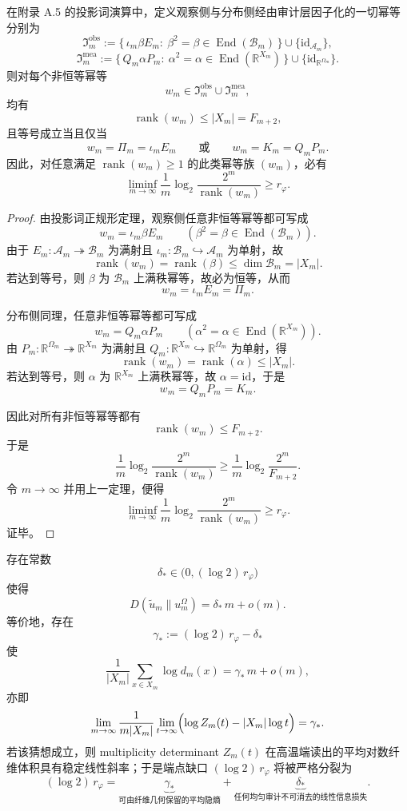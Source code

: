 \begin{theorem}[投影词演算在一次折叠后已饱和]\label{thm:conclusion-fold-audit-onefold-saturation}
在附录 A.5 的投影词演算中，定义观察侧与分布侧经由审计层因子化的一切幂等分别为
\[
\mathfrak I_m^{\mathrm{obs}}
:=
\{\,\iota_m\beta E_m:\ \beta^2=\beta\in \operatorname{End}(\mathcal B_m)\,\}
\cup
\{\mathrm{id}_{\mathcal A_m}\},
\]
\[
\mathfrak I_m^{\mathrm{mea}}
:=
\{\,Q_m\alpha P_m:\ \alpha^2=\alpha\in \operatorname{End}(\mathbb R^{X_m})\,\}
\cup
\{\mathrm{id}_{\mathbb R^{\Omega_m}}\}.
\]
则对每个非恒等幂等
\[
w_m\in \mathfrak I_m^{\mathrm{obs}}\cup \mathfrak I_m^{\mathrm{mea}},
\]
均有
\[
\operatorname{rank}(w_m)\le |X_m|=F_{m+2},
\]
且等号成立当且仅当
\[
w_m=\Pi_m=\iota_mE_m
\qquad\text{或}\qquad
w_m=K_m=Q_mP_m.
\]
因此，对任意满足 \(\operatorname{rank}(w_m)\ge 1\) 的此类幂等族 \((w_m)\)，必有
\[
\liminf_{m\to\infty}
\frac1m\log_2\frac{2^m}{\operatorname{rank}(w_m)}
\ge r_\varphi.
\]
\end{theorem}
\begin{proof}
由投影词正规形定理，观察侧任意非恒等幂等都可写成
\[
w_m=\iota_m\beta E_m
\qquad (\beta^2=\beta\in\operatorname{End}(\mathcal B_m)).
\]
由于 \(E_m:\mathcal A_m\twoheadrightarrow \mathcal B_m\) 为满射且 \(\iota_m:\mathcal B_m\hookrightarrow \mathcal A_m\) 为单射，故
\[
\operatorname{rank}(w_m)=\operatorname{rank}(\beta)\le \dim\mathcal B_m=|X_m|.
\]
若达到等号，则 \(\beta\) 为 \(\mathcal B_m\) 上满秩幂等，故必为恒等，从而
\[
w_m=\iota_mE_m=\Pi_m.
\]

分布侧同理，任意非恒等幂等都可写成
\[
w_m=Q_m\alpha P_m
\qquad (\alpha^2=\alpha\in\operatorname{End}(\mathbb R^{X_m})).
\]
由 \(P_m:\mathbb R^{\Omega_m}\twoheadrightarrow \mathbb R^{X_m}\) 为满射且 \(Q_m:\mathbb R^{X_m}\hookrightarrow \mathbb R^{\Omega_m}\) 为单射，得
\[
\operatorname{rank}(w_m)=\operatorname{rank}(\alpha)\le |X_m|.
\]
若达到等号，则 \(\alpha\) 为 \(\mathbb R^{X_m}\) 上满秩幂等，故 \(\alpha=\mathrm{id}\)，于是
\[
w_m=Q_mP_m=K_m.
\]

因此对所有非恒等幂等都有
\[
\operatorname{rank}(w_m)\le F_{m+2}.
\]
于是
\[
\frac1m\log_2\frac{2^m}{\operatorname{rank}(w_m)}
\ge
\frac1m\log_2\frac{2^m}{F_{m+2}}.
\]
令 \(m\to\infty\) 并用上一定理，便得
\[
\liminf_{m\to\infty}
\frac1m\log_2\frac{2^m}{\operatorname{rank}(w_m)}
\ge
r_\varphi.
\]
证毕。
\end{proof}

\begin{conjecture}[行列式熵律]\label{conj:conclusion-fold-audit-determinant-entropy-law}
存在常数
\[
\delta_\ast\in\bigl(0,(\log 2)\,r_\varphi\bigr)
\]
使得
\[
D(\widetilde u_m\|u_m^\Omega)
=
\delta_\ast\,m+o(m).
\]
等价地，存在
\[
\gamma_\ast:=(\log 2)\,r_\varphi-\delta_\ast
\]
使
\[
\frac1{|X_m|}\sum_{x\in X_m}\log d_m(x)
=
\gamma_\ast\,m+o(m),
\]
亦即
\[
\lim_{m\to\infty}
\frac{1}{m|X_m|}
\lim_{t\to\infty}
\Bigl(\log Z_m(t)-|X_m|\log t\Bigr)
=
\gamma_\ast.
\]
若该猜想成立，则 multiplicity determinant \(Z_m(t)\) 在高温端读出的平均对数纤维体积具有稳定线性斜率；于是端点缺口 \((\log 2)\,r_\varphi\) 将被严格分裂为
\[
(\log 2)\,r_\varphi
=
\underbrace{\gamma_\ast}_{\text{可由纤维几何保留的平均隐熵}}
+
\underbrace{\delta_\ast}_{\text{任何均匀审计不可消去的线性信息损失}}.
\]
\end{conjecture}
